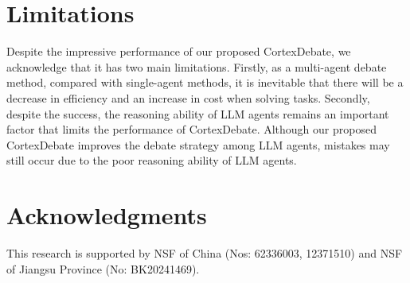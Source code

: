 \section*{Limitations}
Despite the impressive performance of our proposed CortexDebate, we acknowledge that it has two main limitations. Firstly, as a multi-agent debate method, compared with single-agent methods, it is inevitable that there will be a decrease in efficiency and an increase in cost when solving tasks. Secondly, despite the success, the reasoning ability of LLM agents remains an important factor that limits the performance of CortexDebate. Although our proposed CortexDebate improves the debate strategy among LLM agents, mistakes may still occur due to the poor reasoning ability of LLM agents.

\section*{Acknowledgments}

This research is supported by NSF of China (Nos: 62336003, 12371510) and NSF of Jiangsu Province (No: BK20241469).